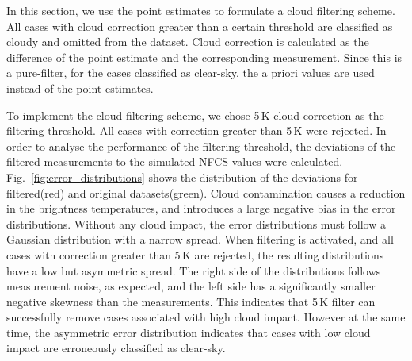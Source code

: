 \documentclass[amt, manuscript]{copernicus}
\begin{document}
In this section, we use the point estimates to formulate a cloud filtering scheme. All cases with  cloud correction greater than a certain threshold are classified as cloudy and omitted from the dataset. Cloud correction is calculated as the difference of the point estimate and the corresponding measurement. Since this is a pure-filter, for the cases classified as clear-sky, the a priori values are used instead of the point estimates. 

To implement the cloud filtering scheme, we chose 5\,K cloud correction as the filtering threshold. All cases with correction greater than 5\,K were rejected. In order to analyse the performance of the filtering threshold, the deviations of the filtered measurements to the simulated NFCS values were calculated. Fig.~\ref{fig:error_distributions} shows the distribution of the deviations for filtered(red) and original datasets(green). Cloud contamination causes a reduction in the brightness temperatures, and introduces a large negative bias in the error distributions. Without any cloud impact, the error distributions must follow a Gaussian distribution with a narrow spread. When filtering is activated, and all cases with correction greater than 5\,K are rejected, the resulting distributions have a low but asymmetric spread. The right side of the distributions follows measurement noise, as expected, and the left side has a significantly smaller negative skewness than the measurements. This indicates that 5\,K filter can successfully remove cases associated with high cloud impact. However at the same time, the asymmetric error distribution indicates that cases with low cloud impact are erroneously classified as clear-sky.
\end{document}
